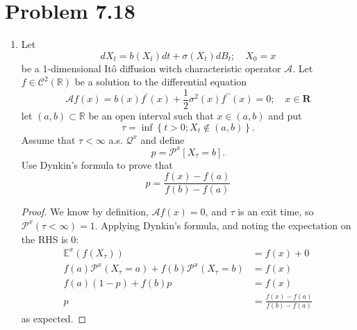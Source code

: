 \documentclass[11pt]{article}
\newcommand{\bbr}{\mathbb{R}}
\renewcommand{\P}{\mathbb{P}}
\newcommand{\ccal}{\mathcal{C}}
\newcommand{\acal}{\mathcal{A}}
\newcommand{\qcal}{\mathcal{Q}}
\renewcommand{\P}{\mathcal{P}}
\newcommand{\E}{\mathbb{E}}
\begin{document}
\section*{Problem 7.18}
\begin{enumerate}
\item Let $$
d X _ { t } = b \left( X _ { t } \right) d t + \sigma \left( X _ { t } \right) d B _ { t } ; \quad X _ { 0 } = x
$$ be a 1-dimensional It\^o diffusion witch characteristic operator $\acal$.  Let $f \in \ccal^2(\bbr)$ be a solution to the differential equation $$
\mathcal { A } f ( x ) = b ( x ) f ^ { \prime } ( x ) + \frac { 1 } { 2 } \sigma ^ { 2 } ( x ) f ^ { \prime \prime } ( x ) = 0 ; \quad x \in \mathbf { R }
$$ let $(a,b)\subset \bbr$ be an open interval such that $x \in (a,b)$ and put $$
\tau = \inf \left\{ t > 0 ; X _ { t } \notin ( a , b ) \right\}.$$  Assume that $\tau<\infty$ a.s. $\qcal^x$ and define $$
p = \P ^ { x } \left[ X _ { \tau } = b \right].
$$
Use Dynkin's formula to prove that 
$$
p = \frac { f ( x ) - f ( a ) } { f ( b ) - f ( a ) }
$$
\begin{proof}
We know by definition, $\acal f(x) =0$, and $\tau$ is an exit time, so $\P^x(\tau<\infty)=1$.  Applying Dynkin's formula, and noting the expectation on the RHS is $0$:
\begin{align*}
\E^x( f(X_\tau)) &= f(x) + 0\\
f(a) \P^x(X_\tau=a)+f(b) \P^x(X_\tau=b) &= f(x)\\
f(a)(1- p) + f(b) p & = f(x)\\
p &= \frac{f(x)-f(a)}{f(b)-f(a)}
\end{align*}
as expected.
\end{proof}
\end{enumerate}
\end{document}
